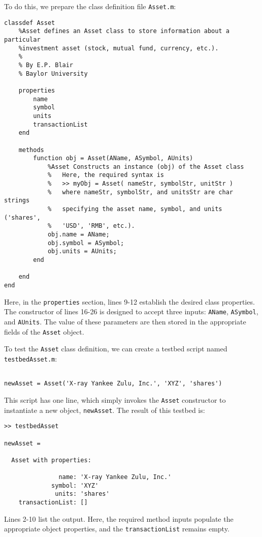 To do this, we prepare the class definition file \texttt{Asset.m}:
\begin{lstlisting}[style=Matlab-editor]
classdef Asset
    %Asset defines an Asset class to store information about a particular
    %investment asset (stock, mutual fund, currency, etc.).
    %
    % By E.P. Blair
    % Baylor University
    
    properties
        name
        symbol
        units
        transactionList
    end
    
    methods
        function obj = Asset(AName, ASymbol, AUnits)
            %Asset Constructs an instance (obj) of the Asset class
            %   Here, the required syntax is
            %   >> myObj = Asset( nameStr, symbolStr, unitStr )
            %   where nameStr, symbolStr, and unitsStr are char strings
            %   specifying the asset name, symbol, and units ('shares',
            %   'USD', 'RMB', etc.).
            obj.name = AName;
            obj.symbol = ASymbol;
            obj.units = AUnits;
        end
        
    end
end
\end{lstlisting}
Here, in the \texttt{properties} section, lines 9-12 establish the desired class properties. The constructor of lines 16-26 is designed to accept three inputs: \texttt{AName}, \texttt{ASymbol}, and \texttt{AUnits}. The value of these parameters are then stored in the appropriate fields of the \texttt{Asset} object.

To test the \texttt{Asset} class definition, we can create a testbed script named \texttt{testbedAsset.m}:
\begin{lstlisting}[style=Matlab-editor]
% testbedAsset.m

newAsset = Asset('X-ray Yankee Zulu, Inc.', 'XYZ', 'shares')
\end{lstlisting}
This script has one line, which simply invokes the \texttt{Asset} constructor to instantiate a new object, \texttt{newAsset}. The result of this testbed is:
\begin{lstlisting}[style=Matlab-editor]
>> testbedAsset

newAsset = 

  Asset with properties:

               name: 'X-ray Yankee Zulu, Inc.'
             symbol: 'XYZ'
              units: 'shares'
    transactionList: []
\end{lstlisting}
Lines 2-10 list the output. Here, the required method inputs populate the appropriate object properties, and the \texttt{transactionList} remains empty.

